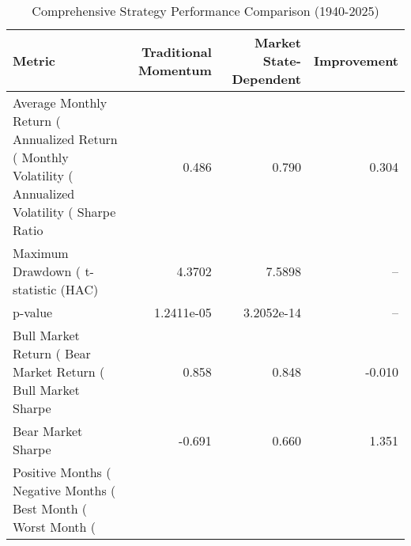 \begin{table}
\caption{Comprehensive Strategy Performance Comparison (1940-2025)}
\label{tab:comprehensive_comparison}
\begin{tabular}{lrrr}
\toprule
Metric & Traditional Momentum & Market State-Dependent & Improvement \\
\midrule
Average Monthly Return (%
Annualized Return (%
Monthly Volatility (%
Annualized Volatility (%
Sharpe Ratio & 0.486 & 0.790 & 0.304 \\
Maximum Drawdown (%
t-statistic (HAC) & 4.3702 & 7.5898 & -- \\
p-value & 1.2411e-05 & 3.2052e-14 & -- \\
Bull Market Return (%
Bear Market Return (%
Bull Market Sharpe & 0.858 & 0.848 & -0.010 \\
Bear Market Sharpe & -0.691 & 0.660 & 1.351 \\
Positive Months (%
Negative Months (%
Best Month (%
Worst Month (%
\bottomrule
\end{tabular}
\end{table}
